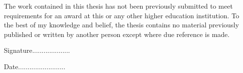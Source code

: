 {

The work contained in this thesis has not been previously submitted to meet requirements for an award at this or any other higher education institution. To the best of my knowledge and belief, the thesis contains no material previously published or written by another person except where due reference is made.

\vspace*{2cm}
\noindent
Signature....................

\vspace*{2cm}
\noindent
Date.........................

}